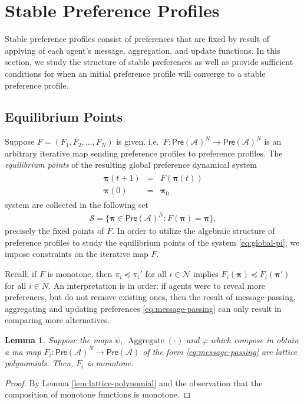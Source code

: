 \documentclass[conference]{ieeeconf}
\newcommand{\N}{\mathcal{N}}
\newcommand{\A}{\mathcal{A}}
\renewcommand{\SS}{\mathcal{S}}
\newcommand{\Pref}{\mathsf{Pre}}
\newcommand{\profile}{\boldsymbol{\pi}}
\DeclareMathOperator{\Aggregate}{Aggregate}
\newtheorem{lemma}{Lemma}
\begin{document}
\section{Stable Preference Profiles}
\label{sec:stable}

Stable preference profiles consist of preferences that are fixed by result of applying of each agent's message, aggregation, and update functions. In this section, we study the structure of stable preferences as well as provide sufficient conditions for when an initial preference profile will converge to a stable preference profile.

\subsection{Equilibrium Points}

Suppose $F = (F_1,F_2,\dots,F_N)$ is given. i.e.~$F: \Pref(\A)^N \to \Pref(\A)^N$ is an arbitrary iterative map sending preference profiles to preference profiles. The \emph{equilibrium points} of the resulting global preference dynamical system
\begin{align}
    \begin{aligned}
        \profile(t+1) &=& F\left( \profile(t) \right) \\
        \profile(0) &=& \profile_0
    \end{aligned} \label{eq:global-pi}
\end{align}
system are collected in the following set
\begin{align*}
    \SS = \{\profile \in \Pref(\A)^N : F(\profile) = \profile \},
\end{align*}
precisely the fixed points of $F$. In order to utilize the algebraic structure of preference profiles to study the equilibrium points of the system \eqref{eq:global-pi}, we impose constraints on the iterative map $F$.

Recall, if $F$ is monotone, then $\pi_i \preceq \pi_i'$ for all $i \in \N$ implies $F_i(\profile) \preceq F_i(\profile')$ for all $i \in N$. An interpretation is in order: if agents were to reveal more preferences, but do not remove existing ones, then the result of message-passing, aggregating and updating preferences \eqref{eq:message-passing} can only result in comparing more alternatives.

\begin{lemma} \label{lem:message-passing}
    Suppose the maps $\psi$, $\Aggregate(\cdot)$ and $\varphi$ which compose in obtain a ma map $F_i: \Pref(\A)^N \to \Pref(\A)$ of the form \eqref{eq:message-passing} are lattice polynomials. Then, $F_i$ is monotone.
\end{lemma}
\begin{proof}
    By Lemma \ref{lem:lattice-polynomial} and the observation that the composition of monotone functions is monotone.
\end{proof}
\end{document}
